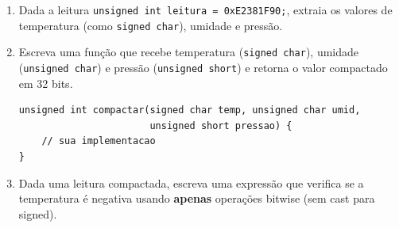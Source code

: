 \documentclass[12pt,a4paper]{article}
\begin{document}
\begin{enumerate}[label=\alph*)]
  \item Dada a leitura \texttt{unsigned int leitura = 0xE2381F90;}, extraia os valores de temperatura (como \texttt{signed char}), umidade e pressão.
  \item Escreva uma função que recebe temperatura (\texttt{signed char}), umidade (\texttt{unsigned char}) e pressão (\texttt{unsigned short}) e retorna o valor compactado em 32 bits.
\begin{lstlisting}[style=code]
unsigned int compactar(signed char temp, unsigned char umid,
                       unsigned short pressao) {
    // sua implementacao
}
\end{lstlisting}
  \item Dada uma leitura compactada, escreva uma expressão que verifica se a temperatura é negativa usando \textbf{apenas} operações bitwise (sem cast para signed).
\end{enumerate}
\fi %
\end{document}
